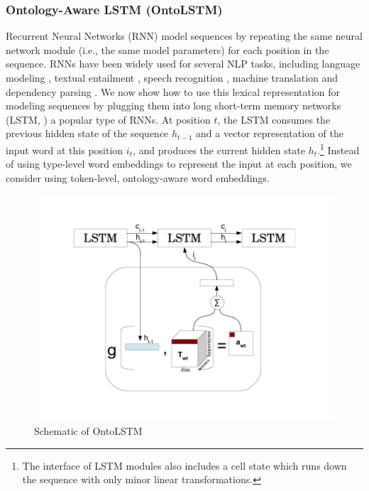 \subsubsection{Ontology-Aware LSTM (OntoLSTM)}
\label{sec:ontolstm}
Recurrent Neural Networks (RNN) model sequences by repeating the same neural network module (i.e., the same model parameters) for each position in the sequence.
RNNs have been widely used for several NLP tasks, including language modeling \citep{mikolov:10}, textual entailment \citep{bowman:15}, speech recognition \citep{graves:13}, machine translation \citep{sutskever:14} and dependency parsing \citep{dyer:15}.
We now show how to use this lexical representation for modeling sequences by plugging them into long short-term memory networks  (LSTM, \cite{hochreiter1997long}) a popular type of RNNs.
At position $t$, the LSTM consumes the previous hidden state of the sequence $h_{t-1}$ and a vector representation of the input word at this position $i_t$, and produces the current hidden state $h_t$.\footnote{The interface of LSTM modules also includes a cell state which runs down the sequence with only minor linear transformations.}
Instead of using type-level word embeddings to represent the input at each position, we consider using token-level, ontology-aware word embeddings.
\begin{figure}
  \begin{center}
  \includegraphics[width=5in]{figures/ontolstm_diagram_modified.png}
  \caption{Schematic of OntoLSTM}
  \label{fig:ontolstm_model}
  \end{center}
 \end{figure}

